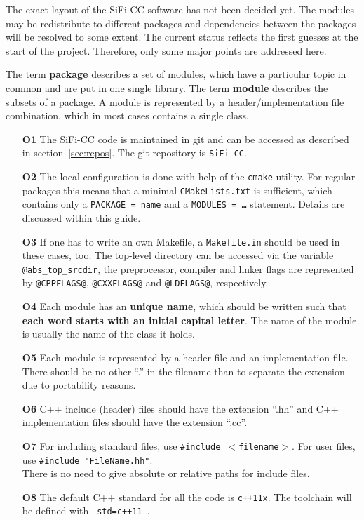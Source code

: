 \documentclass[a4paper,10pt]{article}
\newcommand{\sificc}{SiFi-CC\xspace}
\begin{document}
The exact layout of the \sificc software has not been decided yet. The
modules may be redistribute to different packages and dependencies
between the packages will be resolved to some extent. The current
status reflects the first guesses at the start of the project.
Therefore, only some major points are addressed here.

The term {\bf package} describes a set of modules, which have a
particular topic in common and are put in one single library.
The term {\bf module} describes the subsets of a package. A
module is represented by a header/implementation file combination,
which in most cases contains a single class.

\begin{itemize}
\item[\bf O1]
  The \sificc code is maintained in git and can be accessed as described in
  section~\ref{sec:repos}. The git repository is {\tt \sificc}.
\item[\bf O2]
  The local configuration is done with help of the {\tt cmake} utility.
  For regular packages this means that a minimal {\tt CMakeLists.txt}
  is sufficient, which contains only a {\tt PACKAGE = name} and a
  {\tt MODULES = \dots} statement. Details are discussed within this
  guide.
\item[\bf O3]
  If one has to write an own Makefile, a {\tt Makefile.in} should be
  used in these cases, too. The top-level directory can be accessed
  via the variable {\tt @abs\_top\_srcdir}, the preprocessor, compiler
  and linker flags are represented by {\tt @CPPFLAGS@}, {\tt @CXXFLAGS@}
  and {\tt @LDFLAGS@},
  respectively.
\item[\bf O4]
  Each module has an {\bf unique name}, which should be written
  such that {\bf each word starts with an initial capital letter}. The name
  of the module is usually the name of the class it holds.
\item[\bf O5]
  Each module is represented by a header file and an implementation
  file. There should be no other ``.'' in the filename than to separate the
  extension due to portability reasons.
\item[\bf O6]
  C++ include (header) files should have the extension ``.hh'' and
  C++ implementation files should have the extension ``.cc''.
\item[\bf O7]
  For including standard files, use {\tt \#include $<$filename$>$}.
  For user files, use {\tt \#include "FileName.hh"}.\\
  There is no need to give absolute or relative paths for include files.
\item[\bf O8]
  The default C++ standard for all the code is {\tt c++11x}. The toolchain will
  be defined with {\tt -std=c++11 }.
\end{itemize}
\end{document}
